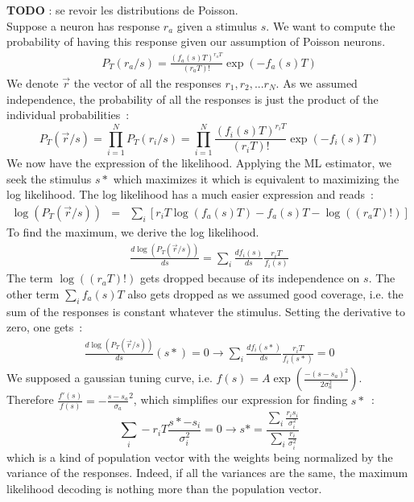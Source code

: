 \documentclass[10pt,a4paper]{article}
\begin{document}
\textbf{TODO} : se revoir les distributions de Poisson.\\

Suppose a neuron has response $r_a$ given a stimulus $s$. We want to
compute the probability of having this response given our assumption
of Poisson neurons. \\
\begin{eqnarray}
P_T(r_a/s) = \frac{(f_a(s) T)^{r_a T}}{(r_aT)!} \exp(-f_a(s) T)
\end{eqnarray}
We denote $\vec{r}$ the vector of all the responses $r_1, r_2,
... r_N$. As we assumed independence, the probability of all the
responses is just the product of the individual probabilities~:
\begin{equation}
P_T(\vec{r}/s) = \prod_{i=1}^N P_T(r_i/s) = \prod_{i=1}^N  \frac{(f_i(s)
  T)^{r_i T}}{(r_i T)!} \exp(-f_i(s) T)
\end{equation}
We now have the expression of the likelihood. Applying the ML
estimator, we seek the stimulus $s*$ which maximizes it which is
equivalent to maximizing the log likelihood. The log likelihood has a
much easier expression and reads~:
\begin{eqnarray}
\log(P_T(\vec{r}/s)) &=& \sum_i [r_i T \log(f_a(s) T) - f_a(s)T -
\log((r_a T)!)]
\end{eqnarray}
To find the maximum, we derive the log likelihood.
\begin{eqnarray}
\frac{d\log(P_T(\vec{r}/s))}{ds} = \sum_i \frac{d f_i(s)}{ds}\frac{r_i
T}{f_i(s)}
\end{eqnarray}
The term $\log((r_a T)!)$ gets dropped because of its independence on
$s$. The other term $\sum_if_a(s)T$ also gets dropped as we assumed
good coverage, i.e. the sum of the responses is constant whatever the
stimulus. Setting the derivative to zero, one gets~:
\begin{eqnarray}
\frac{d\log(P_T(\vec{r}/s))}{ds}(s*) = 0 \rightarrow \sum_i \frac{d f_i(s*)}{ds}\frac{r_i
T}{f_i(s*)} = 0
\end{eqnarray}
We supposed a gaussian tuning curve, i.e. $f(s) = A \exp(\frac{-(s -
  s_a)^2}{2 \sigma_a^2})$. Therefore $\frac{f'(s)}{f(s)} =
-\frac{s-s_a}{\sigma_a}^2$, which simplifies our expression for
finding $s*$~:
\begin{equation}
\sum_i -r_i T \frac{s*-s_i}{\sigma_i^2} = 0 \rightarrow s* =
\frac{\sum_i \frac{r_i s_i}{\sigma_i^2}}{\sum_i \frac{r_i}{\sigma_i^2}}
\end{equation}
which is a kind of population vector with the weights being normalized
by the variance of the responses. Indeed, if all the variances are the
same, the maximum likelihood decoding is nothing more than the
population vector.\\
\end{document}
